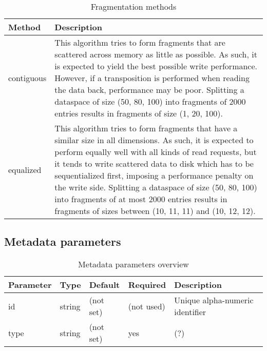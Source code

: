 \begin{preserve}
\begin{table}[!ht]
  \begin{center}
    \begin{tabularx}{\textwidth}{lX}
      Method     & Description \\
      \hline
      contiguous  & This algorithm tries to form fragments that are scattered across memory as little as possible. As such, it is expected to yield the best possible write performance. 
      However, if a transposition is performed when reading the data back, performance may be poor.
      Splitting a dataspace of size (50, 80, 100) into fragments of 2000 entries results in fragments of size (1, 20, 100). \\
      equalized   & This algorithm tries to form fragments that have a similar size in all dimensions. As such, it is expected to perform equally well with all kinds of read requests, but it tends to write scattered data to disk which has to be sequentialized first, imposing a performance penalty on the write side.
      Splitting a dataspace of size (50, 80, 100) into fragments of at most 2000 entries results in fragments of sizes between (10, 11, 11) and (10, 12, 12). \\
    \end{tabularx}
  \end{center}
  \caption{Fragmentation methods}%
  \label{tab:frag_methods}
\end{table}
\end{preserve}
\FloatBarrier
\vspace{\gapsize}

\subsection{Metadata parameters}

\begin{preserve}
\begin{table}[!ht]
  \begin{center}
    \begin{tabularx}{\textwidth}{llllX}
      Parameter & Type   & Default   & Required   & Description                     \\ 
      \hline
      id        & string & (not set) & (not used) & Unique alpha-numeric identifier \\ 
      type      & string & (not set) & yes        & (?)                             \\ 
    \end{tabularx}
  \end{center}
  \caption{Metadata parameters overview}%
  \label{tab:metadata_params}
\end{table}
\end{preserve}

